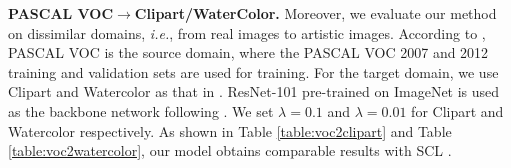 \documentclass[runningheads]{llncs}
\def\ie{{\em i.e.}}
\begin{document}
{\flushleft \textbf{PASCAL VOC$\to$Clipart/WaterColor.}} Moreover, we evaluate our method on dissimilar domains, \ie, from real images to artistic images. According to \cite{DBLP:conf/cvpr/SaitoUHS19}, PASCAL VOC \cite{DBLP:journals/ijcv/EveringhamGWWZ10} is the source domain, where the PASCAL VOC 2007 and 2012 training and validation sets are used for training. For the target domain, we use Clipart \cite{DBLP:conf/cvpr/InoueFYA18} and Watercolor \cite{DBLP:conf/cvpr/InoueFYA18} as that in \cite{DBLP:conf/cvpr/SaitoUHS19}. ResNet-101 \cite{DBLP:conf/cvpr/HeZRS16} pre-trained on ImageNet \cite{DBLP:conf/cvpr/DengDSLL009} is used as the backbone network following \cite{DBLP:conf/cvpr/SaitoUHS19,DBLP:journals/corr/abs-1911-02559}. We set $\lambda = 0.1$ and $\lambda = 0.01$ for Clipart \cite{DBLP:conf/cvpr/InoueFYA18} and Watercolor \cite{DBLP:conf/cvpr/InoueFYA18} respectively. As shown in Table \ref{table:voc2clipart} and Table \ref{table:voc2watercolor}, our model obtains comparable results with SCL \cite{DBLP:journals/corr/abs-1911-02559}.
\end{document}

